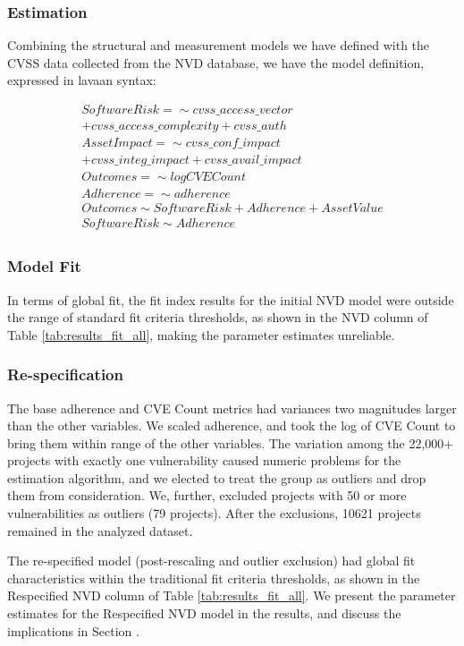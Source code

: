 \subsubsection{Estimation}

Combining the structural and measurement models we have defined with the CVSS data collected from the NVD database, we have the model definition, expressed in lavaan syntax: 

\begin{align*}
	SoftwareRisk =\sim cvss\_access\_vector \\ + cvss\_access\_complexity + cvss\_auth\\
	AssetImpact =\sim cvss\_conf\_impact\\
	+ cvss\_integ\_impact + cvss\_avail\_impact\\
	Outcomes =\sim logCVECount\\
	Adherence =\sim adherence\\
	Outcomes \sim SoftwareRisk + Adherence + AssetValue\\
	SoftwareRisk \sim Adherence\\
\end{align*}		

\subsubsection{Model Fit} 
In terms of global fit, the fit index results for the initial NVD model were outside the range of standard fit criteria thresholds, as shown in the NVD column of Table \ref{tab:results_fit_all}, making the parameter estimates unreliable. 

\subsubsection{Re-specification}
The base adherence and CVE Count metrics had variances two magnitudes larger than the other variables. We scaled adherence, and took the log of CVE Count to bring them within range of the other variables. The variation among the 22,000+ projects with exactly one vulnerability caused numeric problems for the estimation algorithm, and we elected to treat the group as outliers and drop them from consideration. We, further, excluded projects with 50 or more vulnerabilities as outliers (79 projects). After the exclusions, 10621 projects remained in the analyzed dataset.

The re-specified model (post-rescaling and outlier exclusion) had global fit characteristics within the traditional fit criteria thresholds, as shown in the Respecified NVD column of Table \ref{tab:results_fit_all}. We present the parameter estimates for the Respecified NVD model in the results, and discuss the implications in Section \label{sec:case_nvd_discussion}.

